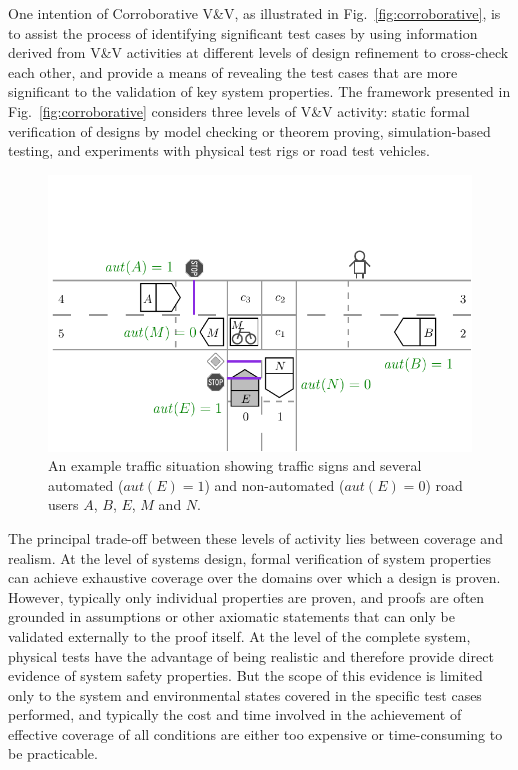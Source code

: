 \documentclass[runningheads,twocolumn,a4paper,10pt]{llncs}
\begin{document}
One intention of Corroborative V\&V, as illustrated in Fig.~\ref{fig:corroborative}, is to assist the process of identifying significant test cases by using information derived from V\&V activities at different levels of design refinement to cross-check each other, and provide a means of revealing the test cases that are more significant to the validation of key system properties. The framework presented in Fig.~\ref{fig:corroborative} considers three levels of V\&V activity: static formal verification of designs by model checking or theorem proving, simulation-based testing,  and experiments with physical test rigs or road test vehicles.

\begin{figure}[]
    \centering
    \includegraphics[width=0.85\linewidth, trim=0 0.8cm 0 2.1cm, clip]{Figures/intersection-signs2.pdf}
    \caption{An example traffic situation showing traffic signs and several automated ($aut(E)=1$) and non-automated ($aut(E)=0$) road users $A$, $B$, $E$, $M$ and $N$.}
    \label{fig:traffic-situation}
\end{figure}

The principal trade-off between these levels of activity
lies between coverage and realism. At the level of systems design, formal verification of system properties can achieve exhaustive coverage over the domains over which a design is proven. However, typically only individual properties are proven, and proofs are often grounded in assumptions or other axiomatic statements that can only be validated externally to the proof itself. At the level of the complete system, physical tests have the advantage of being realistic and therefore provide direct evidence of system safety properties. But the scope of this evidence is limited only to the system and environmental states covered in the specific test cases performed, and typically the cost and time involved in the achievement of effective coverage of all conditions are either too expensive or time-consuming to be practicable.
\end{document}
